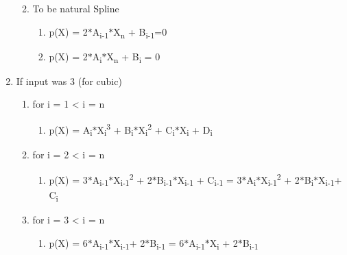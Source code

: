 \documentclass[12pt]{article}
\renewcommand{\_}{\kern-1.5pt\textunderscore\kern-1.5pt}
\begin{document}
\begin{enumerate}
\begin{enumerate}
\begin{enumerate}
\end{enumerate}
	\item To be natural Spline \par

\begin{enumerate}
	\item p(X) = 2$\ast$A\textsubscript{i-1}$\ast$X\textsubscript{n} + B\textsubscript{i-1}=0\par

	\item p(X) = 2$\ast$A\textsubscript{i}$\ast$X\textsubscript{n }+ B\textsubscript{i} = 0\par


\end{enumerate}
\end{enumerate}
	\item If input was 3 (for cubic)\par

\begin{enumerate}
	\item for i = 1 < i = n\par

\begin{enumerate}
	\item p(X) = A\textsubscript{i}$\ast$X\textsubscript{i}\textsuperscript{3} + B\textsubscript{i}$\ast$X\textsubscript{i}\textsuperscript{2} + C\textsubscript{i}$\ast$X\textsubscript{i} + D\textsubscript{i}\par


\end{enumerate}
	\item for i = 2 < i = n\par

\begin{enumerate}
	\item p(X) = 3$\ast$A\textsubscript{i-1}$\ast$X\textsubscript{i-1}\textsuperscript{2} + 2$\ast$B\textsubscript{i-1}$\ast$X\textsubscript{i-1 }+ C\textsubscript{i-1} = 3$\ast$A\textsubscript{i}$\ast$X\textsubscript{i-1}\textsuperscript{2} + 2$\ast$B\textsubscript{i}$\ast$X\textsubscript{i-1}+ C\textsubscript{i}\par


\end{enumerate}
	\item for i = 3 < i = n \par

\begin{enumerate}
	\item p(X) = 6$\ast$A\textsubscript{i-1}$\ast$X\textsubscript{i-1}+ 2$\ast$B\textsubscript{i-1 }= 6$\ast$A\textsubscript{i-1}$\ast$X\textsubscript{i} + 2$\ast$B\textsubscript{i-1}\par



\end{enumerate}
\end{enumerate}
\end{enumerate}
\end{document}
